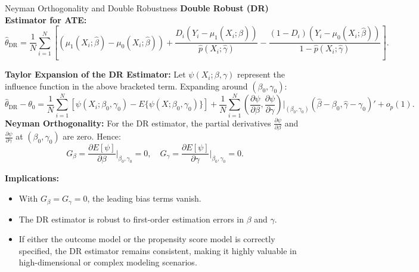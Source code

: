 \documentclass[xcolor=svgnames,t]{beamer}
\begin{document}
    
    \begin{frame}{Neyman Orthogonality and Double Robustness }
        \textbf{Double Robust (DR) Estimator for ATE:}
        {\scriptsize
        \[
        \widehat{\theta}_{\text{DR}} = \frac{1}{N}\sum_{i=1}^N \left[
        (\mu_1(X_i;\widehat{\beta}) - \mu_0(X_i;\widehat{\beta}))
        + \frac{D_i(Y_i - \mu_1(X_i;\widehat{\beta}))}{\widehat{p}(X_i;\widehat{\gamma})}
        - \frac{(1-D_i)(Y_i - \mu_0(X_i;\widehat{\beta}))}{1-\widehat{p}(X_i;\widehat{\gamma})}
        \right].
        \]
        }
        \pause
        
        \textbf{Taylor Expansion of the DR Estimator:} Let \(\psi(X_i; \beta, \gamma)\) represent the influence function in the above bracketed term. Expanding around \((\beta_0,\gamma_0)\):
        {\scriptsize
        \[
        \widehat{\theta}_{\text{DR}} - \theta_0 
        = \frac{1}{N}\sum_{i=1}^N [\psi(X_i; \beta_0,\gamma_0) - E\{\psi(X;\beta_0,\gamma_0)\}]
        + \frac{1}{N}\sum_{i=1}^N \left(\frac{\partial \psi}{\partial \beta}, \frac{\partial \psi}{\partial \gamma}\right)\bigg|_{(\beta_0,\gamma_0)} 
        (\widehat{\beta}-\beta_0, \widehat{\gamma}-\gamma_0)' + o_p(1).
        \]
        }
        \pause
        \scriptsize
        \textbf{Neyman Orthogonality:} For the DR estimator, the partial derivatives \(\frac{\partial \psi}{\partial \beta}\) and \(\frac{\partial \psi}{\partial \gamma}\) at \((\beta_0,\gamma_0)\) are zero. Hence:
        \[
        G_{\beta} = \frac{\partial E[\psi]}{\partial \beta}\bigg|_{\beta_0,\gamma_0} = 0, \quad
        G_{\gamma} = \frac{\partial E[\psi]}{\partial \gamma}\bigg|_{\beta_0,\gamma_0} = 0.
        \]
        
        \pause
        
        
        \textbf{Implications:}
        \begin{itemize}
            \item With \(G_{\beta}=G_{\gamma}=0\), the leading bias terms vanish.
            \item The DR estimator is robust to first-order estimation errors in \(\beta\) and \(\gamma\).
            \item If either the outcome model or the propensity score model is correctly specified, the DR estimator remains consistent, making it highly valuable in high-dimensional or complex modeling scenarios.
        \end{itemize}
        \end{frame}
          
    
   
    
\end{document}
